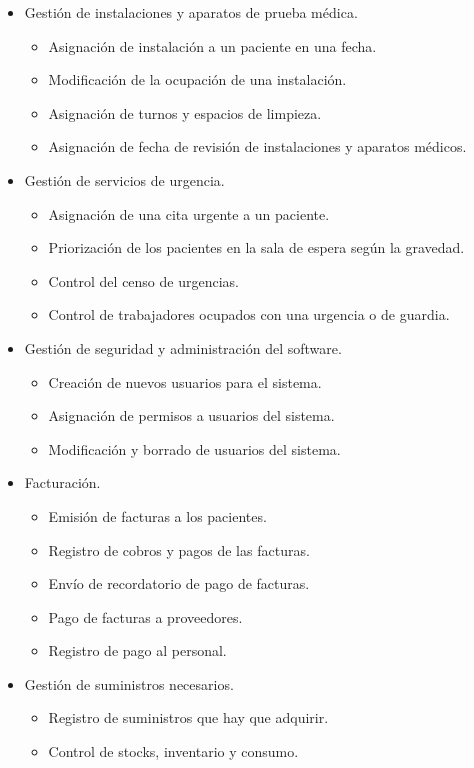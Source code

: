 \documentclass[11pt]{article}
\begin{document}
\begin{itemize}
\item Gestión de instalaciones y aparatos de prueba médica.
\begin{itemize}
\item Asignación de instalación a un paciente en una fecha.
\item Modificación de la ocupación de una instalación.
\item Asignación de turnos y espacios de limpieza.
\item Asignación de fecha de revisión de instalaciones y aparatos médicos.
\end{itemize}

\item Gestión de servicios de urgencia.
\begin{itemize}
\item Asignación de una cita urgente a un paciente.
\item Priorización de los pacientes en la sala de espera según la gravedad.
\item Control del censo de urgencias.
\item Control de trabajadores ocupados con una urgencia o de guardia.
\end{itemize}

\item Gestión de seguridad y administración del software.
\begin{itemize}
\item Creación de nuevos usuarios para el sistema.
\item Asignación de permisos a usuarios del sistema.
\item Modificación y borrado de usuarios del sistema.
\end{itemize}

\item Facturación.
\begin{itemize}
\item Emisión de facturas a los pacientes.
\item Registro de cobros y pagos de las facturas.
\item Envío de recordatorio de pago de facturas.
\item Pago de facturas a proveedores.
\item Registro de pago al personal.
\end{itemize}

\item Gestión de suministros necesarios.
\begin{itemize}
\item Registro de suministros que hay que adquirir.
\item Control de stocks, inventario y consumo.
\end{itemize}


\end{itemize}
\end{document}
